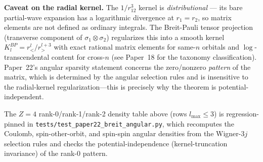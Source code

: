 \documentclass[twocolumn,pra,amsmath,amssymb,superscriptaddress]{revtex4-2}
\begin{document}
\textbf{Caveat on the radial kernel.} The $1/r_{12}^3$ kernel is
\emph{distributional} --- its bare partial-wave expansion has a
logarithmic divergence at $r_1 = r_2$, so matrix elements are not
defined as ordinary integrals. The Breit-Pauli tensor projection
(transverse component of $\sigma_1 \otimes \sigma_2$) regularizes this
into a smooth kernel $K_l^{BP} = r_<^l / r_>^{l+3}$ with exact rational
matrix elements for same-$n$ orbitals and $\log$-transcendental
content for cross-$n$ (see Paper~18 for the
taxonomy classification). Paper~22's angular sparsity statement
concerns the zero/nonzero \emph{pattern} of the matrix, which is
determined by the angular selection rules and is insensitive to the
radial-kernel regularization---this is precisely why the theorem is
potential-independent.

The $Z=4$ rank-0/rank-1/rank-2 density table above (rows $l_{\max} \le 3$)
is regression-pinned in \texttt{tests/test\_paper22\_breit\_angular.py},
which recomputes the Coulomb, spin-other-orbit, and spin-spin angular
densities from the Wigner-$3j$ selection rules and checks the
potential-independence (kernel-truncation invariance) of the rank-0
pattern.
\end{document}
